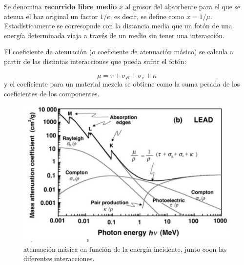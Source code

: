 Se denomina \textbf{recorrido libre medio} $\overline{x}$ al grosor del absorbente para el que se atenua el haz original un factor $1/e$, es decir, se define como $\overline{x} = 1/\mu$. Estadísticamente se corresopnde con la distancia media que un fotón de una energía determinada viaja a  través de un medio sin tener una interacción. 

El coeficiente de atenuación (o coeficiente de atenuación másico) se calcula a partir de las distintas interacciones que pueda sufrir el fotón: 

\begin{equation}
    \mu = \tau + \sigma_R + \sigma_c + \kappa
\end{equation}
y el coeficiente para un material mezcla se obtiene como la suma pesada de los coeficientes de los componentes.

\begin{figure}[H] \centering
    \caption{atenuación másica en función de la energía incidente, junto coon las diferentes interacciones.}
    \includegraphics[width=0.7\linewidth]{Cuerpo/Ch_01/Interaccion_02.png}
\end{figure}


